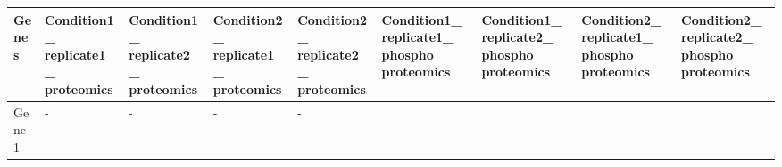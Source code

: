 \documentclass[]{article}
\begin{document}
\begin{longtable}[]{@{}lllllllll@{}}
\toprule
\begin{minipage}[b]{0.08\columnwidth}\raggedright
Genes\strut
\end{minipage} & \begin{minipage}[b]{0.08\columnwidth}\raggedright
Condition1\_ replicate1\_ proteomics\strut
\end{minipage} & \begin{minipage}[b]{0.08\columnwidth}\raggedright
Condition1\_ replicate2\_ proteomics\strut
\end{minipage} & \begin{minipage}[b]{0.08\columnwidth}\raggedright
Condition2\_ replicate1\_ proteomics\strut
\end{minipage} & \begin{minipage}[b]{0.08\columnwidth}\raggedright
Condition2\_ replicate2\_ proteomics\strut
\end{minipage} & \begin{minipage}[b]{0.08\columnwidth}\raggedright
Condition1\_ replicate1\_ phospho proteomics\strut
\end{minipage} & \begin{minipage}[b]{0.08\columnwidth}\raggedright
Condition1\_ replicate2\_ phospho proteomics\strut
\end{minipage} & \begin{minipage}[b]{0.08\columnwidth}\raggedright
Condition2\_ replicate1\_ phospho proteomics\strut
\end{minipage} & \begin{minipage}[b]{0.08\columnwidth}\raggedright
Condition2\_ replicate2\_ phospho proteomics\strut
\end{minipage}\tabularnewline
\midrule
\endhead
\begin{minipage}[t]{0.08\columnwidth}\raggedright
Gene1\strut
\end{minipage} & \begin{minipage}[t]{0.08\columnwidth}\raggedright
-\strut
\end{minipage} & \begin{minipage}[t]{0.08\columnwidth}\raggedright
-\strut
\end{minipage} & \begin{minipage}[t]{0.08\columnwidth}\raggedright
-\strut
\end{minipage} & \begin{minipage}[t]{0.08\columnwidth}\raggedright
-\strut
\end{minipage} & \begin{minipage}[t]{0.08\columnwidth}\raggedright

\end{minipage}
\end{longtable}
\end{document}
